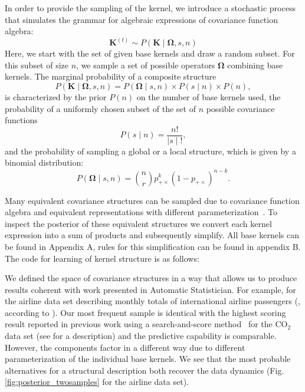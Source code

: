 In order to provide the sampling of the kernel, we introduce a stochastic process that simulates the grammar for algebraic expressions of covariance function algebra:
\begin{equation}
\mathbf{K}^{(t)} \sim  P(\mathbf{K} \mid \bm{\Omega},s,n)
\end{equation}
Here, we start with the set of given base kernels and draw a random subset.
For this subset of size $n$, we sample a set of possible operators $\bm{\Omega}$ combining base kernels. 
The marginal probability of a composite structure
\begin{equation}
P(\mathbf{K} \mid \bm{\Omega},s,n) = P(\bm{\Omega} \mid s,n)\times P(s \mid n) \times P(n),
\end{equation}
is characterized by the prior $P(n)$ on the number of base kernels used, the probability of a uniformly chosen subset of the set of $n$ possible covariance functions
\begin{equation}
\label{eq:subsets}
P(s \mid n) = \frac{n!}{ \mid s \mid !},
\end{equation}
and the probability of sampling a global or a local structure, which is given by a binomial distribution: 
\begin{equation}
P(\bm{\Omega} \mid s,n)= {n \choose r}  p_{+\times}^k (1 - p_{+\times})^{n-k}.
\end{equation}



Many equivalent covariance structures can be sampled due to covariance function algebra and equivalent representations with different parameterization~\citep{lloyd2014automatic}. To inspect the posterior of these equivalent structures we convert each kernel expression into a sum of products and subsequently simplify. All base kernels can be found in Appendix A, rules for this simplification can be found in appendix B. The code for learning of kernel structure is as follows:



We defined the space of covariance structures in a way that allows us to produce results coherent with 
work presented in Automatic Statistician. For example, for the airline data set describing monthly totals of international airline passengers (\citealp{box2011time}, according to \citealp{duvenaud2013structure}). Our most frequent sample is identical with the highest scoring result reported in previous work using a search-and-score method~\citep{duvenaud2013structure} for the CO$_2$ data set (see \citealp{rasmussen2006gaussian} for a description) and the predictive capability is comparable. However, the components factor in a different way due to different parameterization of the individual base kernels. We see that the most probable alternatives for a structural description both recover the data dynamics (Fig. \ref{fig:posterior_twosamples} for the airline data set).

